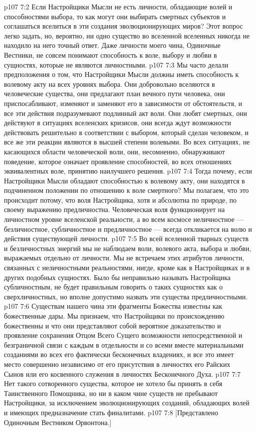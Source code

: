 \vs p107 7:2 Если Настройщики Мысли не есть личности, обладающие волей и способностями выбора, то как могут они выбирать смертных субъектов и соглашаться вселиться в эти создания эволюционирующих миров? Этот вопрос легко задать, но, вероятно, ни одно существо во вселенной вселенных никогда не находило на него точный ответ. Даже личности моего чина, Одиночные Вестники, не совсем понимают способность к воле, выбору и любви в сущностях, которые не являются личностными.
\vs p107 7:3 Мы часто делали предположения о том, что Настройщики Мысли должны иметь способность к волевому акту на всех  уровнях выбора. Они добровольно вселяются в человеческие существа, они предлагают план вечного пути человека, они приспосабливают, изменяют и заменяют его в зависимости от обстоятельств, и все эти действия подразумевают подлинный акт воли. Они любят смертных, они действуют в ситуациях вселенских кризисов, они всегда ждут возможности действовать решительно в соответствии с выбором, который сделан человеком, и все же эти реакции являются в высшей степени волевыми. Во всех ситуациях, не касающихся области человеческой воли, они, несомненно, обнаруживают поведение, которое означает проявление способностей, во всех отношениях эквивалентных воле, принятию наилучшего решения.
\vs p107 7:4 Тогда почему, если Настройщики Мысли обладают способностью к волевому акту, они находятся в подчиненном положении по отношению к воле смертного? Мы полагаем, что это происходит потому, что воля Настройщика, хотя и абсолютна по природе, по своему выражению предличностна. Человеческая воля функционирует на личностном уровне вселенской реальности, а во всем космосе неличностное --- безличностное, субличностное и предличностное --- всегда откликается на волю и действия существующей личности.
\vs p107 7:5 Во всей вселенной тварных существ и безличностных энергий мы не наблюдаем воли, волевого акта, выбора и любви, выражаемых отдельно от личности. Мы не встречаем этих атрибутов личности, связанных с неличностными реальностями, нигде, кроме как в Настройщиках и в других подобных сущностях. Было бы неправильно называть Настройщика субличностным, не будет правильным говорить о таких сущностях как о сверхличностных, но вполне допустимо назвать эти существа предличностными.
\vs p107 7:6 \pc Существам нашего чина эти фрагменты Божества известны как божественные дары. Мы признаем, что Настройщики по происхождению божественны и что они представляют собой вероятное доказательство и проявление сохранения Отцом Всего Сущего возможности непосредственной и безграничной связи с каждым в отдельности и со всеми вместе материальными созданиями во всех его фактически бесконечных владениях, и все это имеет место совершенно независимо от его присутствия в личностях его Райских Сынов или его косвенного служения в личностях Бесконечного Духа.
\vs p107 7:7 Нет такого сотворенного существа, которое не хотело бы принять в себя Таинственного Помощника, но ни в каком чине существ не пребывают Настройщики, за исключением эволюционирующих созданий, обладающих волей и имеющих предназначение стать финалитами.
\vsetoff
\vs p107 7:8 [Представлено Одиночным Вестником Орвонтона.]
